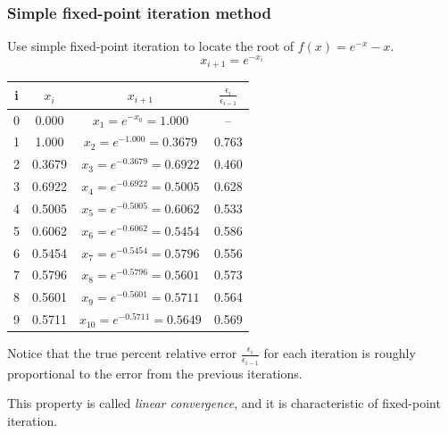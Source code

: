 \documentclass{if-beamer}
\begin{document}
\begin{frame}[t]
\frametitle{Simple fixed-point iteration method}
Use simple fixed-point iteration to locate the root of $f(x) = e^{-x}-x$.
$$x_{i+1} = e^{-x_i}$$
\begin{minipage}{0.7\textwidth}
	\begin{table}
		\begin{tabular}{c | c | c | c}
			i & $x_i$ & $x_{i+1}$ & $\frac{\epsilon_i}{\epsilon_{i-1}}$\\
			\hline
			0 & 0.000 & $x_1= e^{-x_0} = 1.000$ &  --\\ 
			1 & 1.000 & $x_2 = e^{-1.000}= 0.3679$ & 0.763 \\
			2 & 0.3679 & $x_3 = e^{-0.3679} =  0.6922$ & 0.460 \\ 
			3 & 0.6922 & $x_4 = e^{-0.6922} = 0.5005$ & 0.628 \\
			4 & 0.5005 & $x_5 = e^{-0.5005} =  0.6062$ & 0.533\\	
			5 & 0.6062 & $x_6 = e^{-0.6062} = 0.5454$ & 0.586\\
			6 & 0.5454 & $x_7 = e^{-0.5454} = 0.5796$ & 0.556\\
			7 & 0.5796 & $x_8 = e^{-0.5796} = 0.5601$ & 0.573 \\
			8 & 0.5601 & $x_9 = e^{-0.5601} = 0.5711$ & 0.564\\
			9 & 0.5711 & $x_{10} =e^{-0.5711} = 0.5649$ & 0.569
		\end{tabular}
	\end{table}
\end{minipage}
\begin{minipage}{0.3\textwidth}
	Notice that the true percent relative error  $\frac{\epsilon_i}{\epsilon_{i-1}}$ for each iteration is roughly proportional to the error from the previous iterations.\\\vspace{3pt}
	
	This property is called \textit{linear convergence}, and it is characteristic of fixed-point
	iteration.
\end{minipage}

\end{frame}
\end{document}
